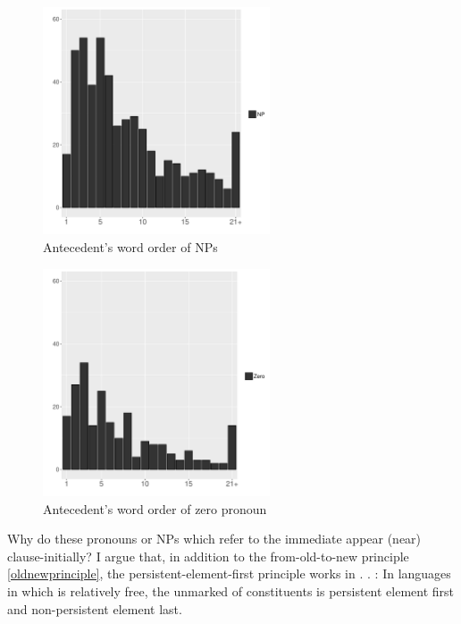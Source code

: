\begin{figure}
	\begin{center}
	\includegraphics[width=0.6\textwidth]{figure/ExpTypePrevWO.pdf}
	\caption{Antecedent's word order of NPs}
	\label{ExpTypePrevWOF}
	\end{center}
\end{figure}
\begin{figure}
	\begin{center}
	\includegraphics[width=0.6\textwidth]{figure/ExpTypePrevWOZero.pdf}
	\caption{Antecedent's word order of zero pronoun}
	\label{ExpTypePrevWOZeroF}
	\end{center}
\end{figure}

Why do these pronouns or NPs which refer to the immediate  appear (near) clause-initially?
I argue that, in addition to the from-old-to-new principle \ref{oldnewprinciple},
the persistent-element-first principle works in .
%
\ex. \label{PerFirstPrinciple}:
 In languages in which  is relatively free,
 the unmarked  of constituents is persistent element first and non-persistent element last.

